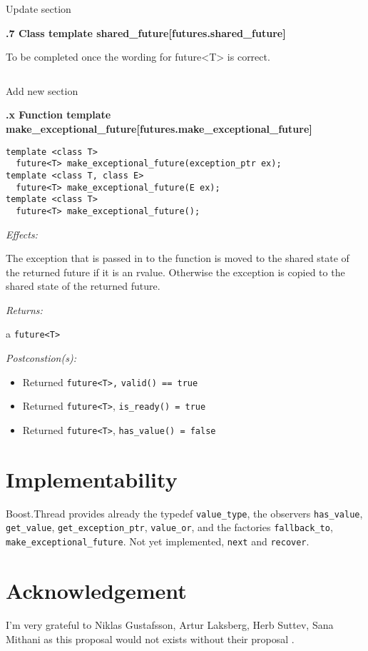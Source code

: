 \documentclass[a4paper,10pt]{article}
\newcommand{\wordingUpdateSubSubSec}[2]{\vspace{15pt}
\noindent
{\textbf{\quad #1\hfill\textbf{[#2]}}}
\label{#2}
\vspace{7pt}
}
\newcommand{\wordingNewSubSubSec}[2]{\vspace{15pt}
\noindent
{\textbf{\quad #1\hfill\textbf{[#2]}}}
\label{#2}
\vspace{7pt}
}
\newcommand{\cpp}[1]{\lstinline{#1}}
\newcommand{\wordingItem}[1]{\noindent\textit{#1:}}
\newenvironment{wordingPara}{\begin{adjustwidth}{12pt}{}}{\end{adjustwidth}}
\newenvironment{Effects}{\wordingItem{Effects}\vspace{7pt}\noindent\begin{adjustwidth}{12pt}{}}{\vspace{7pt}\end{adjustwidth}}
\newenvironment{Returns}{\wordingItem{Returns}\vspace{7pt}\noindent\begin{adjustwidth}{12pt}{}}{\vspace{7pt}\end{adjustwidth}}
\newenvironment{Postconditions}{\wordingItem{Postconstion(s)}\vspace{7pt}\noindent\begin{adjustwidth}{12pt}{}}{\vspace{7pt}\end{adjustwidth}}
\begin{document}
\noindent
Update section

\wordingUpdateSubSubSec{30.6.7 Class template shared_future}{futures.shared_future}

\noindent
To be completed once the wording for future<T> is correct.

\begin{lstlisting}[xleftmargin=0pt]
\end{lstlisting}

\noindent
Add new section

\wordingNewSubSubSec{30.6.x Function template make_exceptional_future}{futures.make_exceptional_future}


\begin{lstlisting}[xleftmargin=0pt]
template <class T>
  future<T> make_exceptional_future(exception_ptr ex);
template <class T, class E>
  future<T> make_exceptional_future(E ex);
template <class T>
  future<T> make_exceptional_future();
\end{lstlisting}
\begin{wordingPara}

\begin{Effects}
The exception that is passed in to the function is moved to the shared state of the returned future if it 
is an rvalue. Otherwise the exception is copied to the shared state of the returned future. 
\end{Effects}
 
\begin{Returns}
a \cpp{future<T>} 
\end{Returns}

\begin{Postconditions}
\begin{itemize}
\item Returned \cpp{future<T>,} \cpp{valid() == true} 
\item Returned \cpp{future<T>}, \cpp{is_ready() = true}
\item Returned \cpp{future<T>}, \cpp{has_value() = false}
\end{itemize}
\end{Postconditions}

\end{wordingPara}
\section{Implementability}

Boost.Thread \cite{BOOST_THREAD} provides already the typedef \cpp{value_type}, the observers \cpp{has_value}, \cpp{get_value}, \cpp{get_exception_ptr}, \cpp{value_or}, and the factories \cpp{fallback_to}, \cpp{make_exceptional_future}. Not yet implemented, \cpp{next} and \cpp{recover}.

\section{Acknowledgement}

I'm very grateful to Niklas Gustafsson, Artur Laksberg, Herb Suttev, Sana Mithani as this proposal would not exists without their proposal  \cite{N3784}.


\newpage


\end{document}
